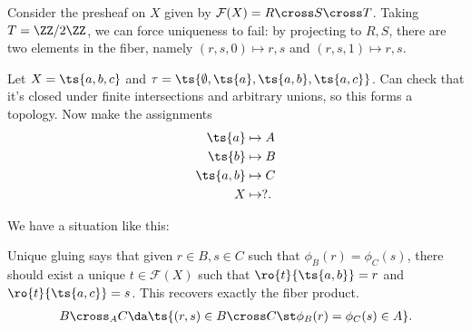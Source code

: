 \begin{example}

Consider the presheaf on \(X\) given by
\(\mathcal{F}(X) = R\cross S \cross T\). Taking \(T = \ZZ/2\ZZ\), we can
force uniqueness to fail: by projecting to \(R, S\), there are two
elements in the fiber, namely \((r,s,0)\mapsto r,s\) and
\((r,s,1)\mapsto r,s\).

\end{example}

\begin{example}

Let \(X = \ts{a, b, c}\) and
\(\tau = \ts{\emptyset, \ts{a}, \ts{a, b}, \ts{a, c}}\). Can check that
it's closed under finite intersections and arbitrary unions, so this
forms a topology. Now make the assignments
\begin{align*}  
\ts{a}& \mapsto A \\
\ts{b}& \mapsto B \\
\ts{a, b}& \mapsto C \\
X &\mapsto ?
.\end{align*}

We have a situation like this:

\begin{center}\end{center}

Unique gluing says that given \(r\in B, s\in C\) such that
\(\phi_B(r) = \phi_C(s)\), there should exist a unique
\(t\in \mathcal{F}(X)\) such that \(\ro{t}{\ts{a, b}} = r\) and
\(\ro{t}{\ts{a, c}} = s\). This recovers exactly the fiber product.
\begin{align*}  
B \cross_A C \da \ts{(r, s) \in B\cross C \st \phi_B(r) = \phi_C(s) \in A}
.\end{align*}

\end{example}

